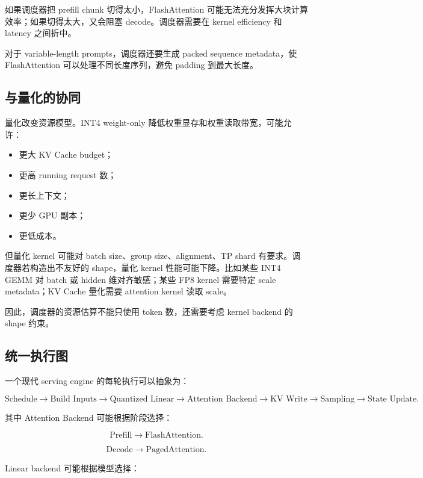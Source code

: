 如果调度器把 prefill chunk 切得太小，FlashAttention 可能无法充分发挥大块计算效率；如果切得太大，又会阻塞 decode。调度器需要在 kernel efficiency 和 latency 之间折中。

对于 variable-length prompts，调度器还要生成 packed sequence metadata，使 FlashAttention 可以处理不同长度序列，避免 padding 到最大长度。

\subsection{与量化的协同}
\label{subsec:scheduler-with-quantization}

量化改变资源模型。INT4 weight-only 降低权重显存和权重读取带宽，可能允许：

\begin{itemize}
\item 更大 KV Cache budget；
\item 更高 running request 数；
\item 更长上下文；
\item 更少 GPU 副本；
\item 更低成本。
\end{itemize}

但量化 kernel 可能对 batch size、group size、alignment、TP shard 有要求。调度器若构造出不友好的 shape，量化 kernel 性能可能下降。比如某些 INT4 GEMM 对 batch 或 hidden 维对齐敏感；某些 FP8 kernel 需要特定 scale metadata；KV Cache 量化需要 attention kernel 读取 scale。

因此，调度器的资源估算不能只使用 token 数，还需要考虑 kernel backend 的 shape 约束。

\subsection{统一执行图}
\label{subsec:unified-serving-execution-graph}

一个现代 serving engine 的每轮执行可以抽象为：

\[
\text{Schedule}
\rightarrow
\text{Build Inputs}
\rightarrow
\text{Quantized Linear}
\rightarrow
\text{Attention Backend}
\rightarrow
\text{KV Write}
\rightarrow
\text{Sampling}
\rightarrow
\text{State Update}.
\]

其中 Attention Backend 可能根据阶段选择：

\[
\text{Prefill}
\rightarrow
\text{FlashAttention}.
\]

\[
\text{Decode}
\rightarrow
\text{PagedAttention}.
\]

Linear backend 可能根据模型选择：

